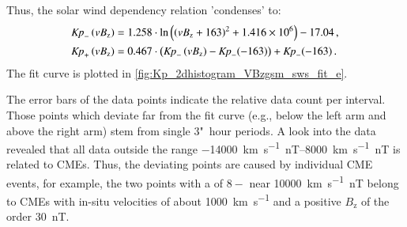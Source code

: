 Thus, the solar wind dependency relation 'condenses' to:
\begin{align}
	\text{\textit{Kp}}_-\left(vB_\text{z}\right) &= 1.258 \cdot \ln\left(\left(vB_\text{z} + 163\right)^2 + \num{1.416e6}\right) - 17.04	\,,	\label{eq:kpvsvbz_dependency_function_negative}\\
	\text{\textit{Kp}}_+\left(vB_\text{z}\right) &= 0.467 \cdot \left(\text{\textit{Kp}}_-\left(vB_\text{z}\right) - \text{\textit{Kp}}_-(-163)\right) + \text{\textit{Kp}}_-(-163)	\,.	\label{eq:kpvsvbz_dependency_function_positive}
\end{align}
The fit curve is plotted in \autoref{fig:Kp_2dhistogram_VBzgsm_sws_fit_e}.
\begin{figure}
\end{figure}
The error bars of the data points indicate the relative data count per \vBz{} interval. Those points which deviate far from the fit curve (e.g., below the left arm and above the right arm) stem from single 3"~hour periods. A look into the data revealed that all data outside the range \SIrange{-14000}{8000}{\km\per\s\nano\tesla} is related to CMEs. Thus, the deviating points are caused by individual CME events, for example, the two points with a \Kp{} of $8-$ near \SI{10000}{\km\per\s\nano\tesla} belong to CMEs with in-situ velocities of about \SI{1000}{\km\per\s} and a positive $B_\text{z}$ of the order \SI{30}{\nano\tesla}.

